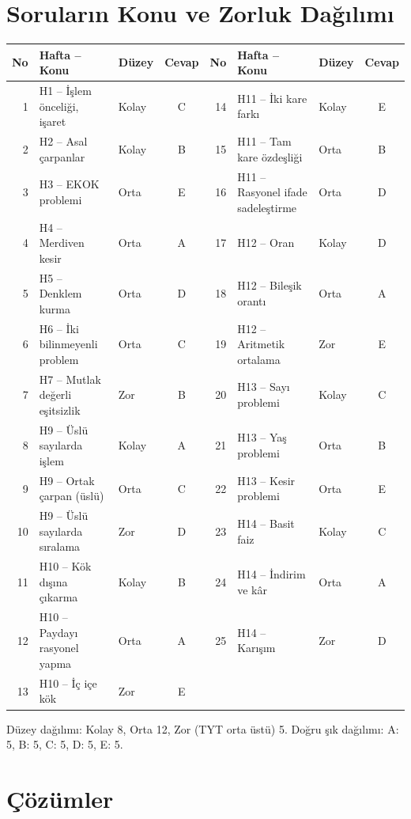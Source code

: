 \documentclass[11pt,a4paper]{article}
\begin{document}
\section*{Soruların Konu ve Zorluk Dağılımı}
\begin{center}\small\setlength{\tabcolsep}{4pt}
\begin{tabular}{@{}r l l c@{\hspace{1.2em}}|@{\hspace{1.2em}}r l l c@{}}
\toprule
No & Hafta -- Konu & Düzey & Cevap & No & Hafta -- Konu & Düzey & Cevap\\
\midrule
1 & H1 -- İşlem önceliği, işaret & Kolay & C & 14 & H11 -- İki kare farkı & Kolay & E\\
2 & H2 -- Asal çarpanlar & Kolay & B & 15 & H11 -- Tam kare özdeşliği & Orta & B\\
3 & H3 -- EKOK problemi & Orta & E & 16 & H11 -- Rasyonel ifade sadeleştirme & Orta & D\\
4 & H4 -- Merdiven kesir & Orta & A & 17 & H12 -- Oran & Kolay & D\\
5 & H5 -- Denklem kurma & Orta & D & 18 & H12 -- Bileşik orantı & Orta & A\\
6 & H6 -- İki bilinmeyenli problem & Orta & C & 19 & H12 -- Aritmetik ortalama & Zor & E\\
7 & H7 -- Mutlak değerli eşitsizlik & Zor & B & 20 & H13 -- Sayı problemi & Kolay & C\\
8 & H9 -- Üslü sayılarda işlem & Kolay & A & 21 & H13 -- Yaş problemi & Orta & B\\
9 & H9 -- Ortak çarpan (üslü) & Orta & C & 22 & H13 -- Kesir problemi & Orta & E\\
10 & H9 -- Üslü sayılarda sıralama & Zor & D & 23 & H14 -- Basit faiz & Kolay & C\\
11 & H10 -- Kök dışına çıkarma & Kolay & B & 24 & H14 -- İndirim ve kâr & Orta & A\\
12 & H10 -- Paydayı rasyonel yapma & Orta & A & 25 & H14 -- Karışım & Zor & D\\
13 & H10 -- İç içe kök & Zor & E &  & & & \\
\bottomrule\end{tabular}
\end{center}
{\small Düzey dağılımı: Kolay 8, Orta 12, Zor (TYT orta üstü) 5. \quad Doğru şık dağılımı: A: 5, B: 5, C: 5, D: 5, E: 5.}

\section*{Çözümler}
\end{document}
